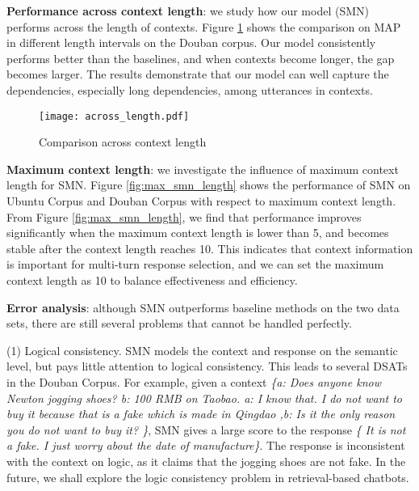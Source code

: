 \documentclass[11pt,a4paper]{article}
\begin{document}
	\textbf{Performance across context length}: we study how our model (SMN) performs across the length of contexts. Figure \ref{length} shows the comparison on MAP in different length intervals on the Douban corpus. Our model consistently performs better than the baselines, and when contexts become longer, the gap becomes larger. The results demonstrate that our model can well capture the dependencies, especially long dependencies, among utterances in contexts.\begin{figure}[!h] \vspace{-2mm} \centering 
			\texttt{[image: across\_length.pdf]}	\vspace{-3mm}			\caption{Comparison across context length}	\label{length} \vspace{-3mm}	
		\end{figure}
	
\textbf{Maximum context length}: we investigate the influence of maximum context length for SMN. Figure  \ref{fig:max_smn_length} shows the performance of SMN on Ubuntu Corpus and Douban Corpus with respect to maximum context length. From Figure  \ref{fig:max_smn_length}, we find that performance improves significantly when the maximum context length is lower than 5, and becomes stable after the context length reaches 10. This indicates that context information is important for multi-turn response selection, and we can set the maximum context length as 10 to balance effectiveness and efficiency. 
	\begin{figure*}[h]
		\centering
		
		\caption{Performance of SMN across maximum context length}		\label{fig:max_smn_length}
	\end{figure*}

	\textbf{Error analysis}: although SMN outperforms baseline methods on the two data sets, there are still several problems that cannot be handled perfectly.
	
	(1) Logical consistency. SMN models the context and response on the semantic level, but pays little attention to logical consistency. This leads to several DSATs in the Douban Corpus. For example, given a context \emph{\{a: Does anyone know Newton jogging shoes? b: 100 RMB on Taobao. a: I know that. I do not want to buy it because that is a fake which is made in Qingdao ,b: Is it the only reason you do not want to buy it? \}}, SMN gives a large score to the response  \emph{\{ It is not a fake. I just worry about the date of manufacture\}}. The response is inconsistent with the context on logic, as it claims that the jogging shoes are not fake. In the future, we shall explore the logic consistency problem in retrieval-based chatbots.
	
\end{document}
